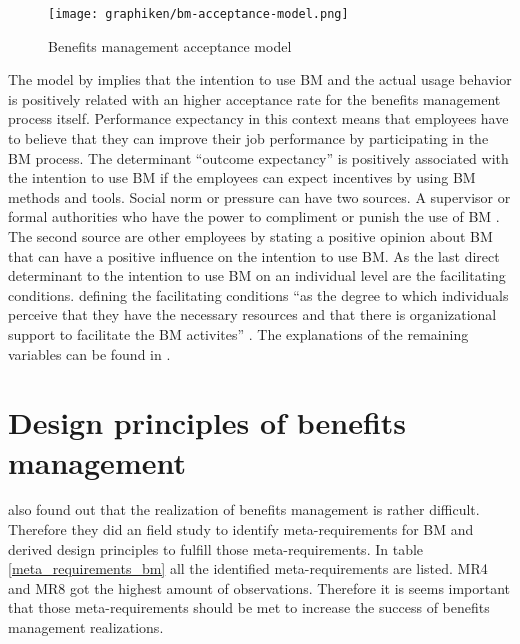 \begin{figure}[h]
\centering
\texttt{[image: graphiken/bm-acceptance-model.png]}%
\caption{Benefits management acceptance model \citep[p.595]{hesselmann_not_2015}}%
\label{bm_acceptance_model}%
\end{figure}

The model by \citet{hesselmann_not_2015} implies that the intention to use BM and the actual usage behavior is positively related with an higher acceptance rate for the benefits management process itself. Performance expectancy in this context means that employees have to believe that they can improve their job performance by participating in the BM process. The determinant ``outcome expectancy'' is positively associated with the intention to use BM if the employees can expect incentives by using BM methods and tools. Social norm or pressure can have two sources. A supervisor or formal authorities who have the power to compliment or punish the use of BM \citep[cited in][p.591]{hesselmann_not_2015}. The second source are other employees by stating a positive opinion about BM that can have a positive influence on the intention to use BM. As the last direct determinant to the intention to use BM on an individual level are the facilitating conditions. \citet{hesselmann_not_2015} defining the facilitating conditions ``as the degree to which individuals perceive that they have the necessary resources and that there is organizational support to facilitate the BM activites'' \citep[cited in][p.592]{hesselmann_not_2015}. The explanations of the remaining variables can be found in \citet[p.592f.]{hesselmann_not_2015}.

\section{Design principles of benefits management}
\label{designprinciples_benefits_management}

\citet{ahlemann_exploiting_2013} also found out that the realization of benefits management is rather difficult. Therefore they did an field study to identify meta-requirements for BM and derived design principles to fulfill those meta-requirements. In table \ref{meta_requirements_bm} all the identified meta-requirements are listed. MR4 and MR8 got the highest amount of observations. Therefore it is seems important that those meta-requirements should be met to increase the success of benefits management realizations.

